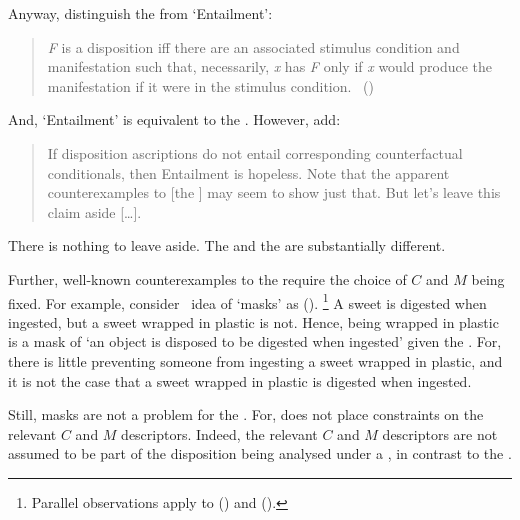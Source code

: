 \begin{note}
{    Anyway, \citeauthor{Choi:2021wg} distinguish the \dSCAa{} from `Entailment':
    \begin{quote}
      \emph{F} is a disposition iff there are an associated stimulus condition and manifestation such that, necessarily, \emph{x} has \emph{F} only if \emph{x} would produce the manifestation if it were in the stimulus condition.%
      \mbox{ }\hfill\mbox{(\citeyear[\S2.1]{Choi:2021wg})}
    \end{quote}
    And, `Entailment' is equivalent to the .
    However, \citeauthor{Choi:2021wg} add:
    \begin{quote}
      If disposition ascriptions do not entail corresponding counterfactual conditionals, then Entailment is hopeless.
      Note that the apparent counterexamples to [the \dSCAa{}] may seem to show just that.
      But let's leave this claim aside [\dots].
    \end{quote}
    There is nothing to leave aside.
    The \dSCAa{} and the \dBCAa{} are substantially different.
  }

  Further, well-known counterexamples to the \dSCAa{} require the choice of \(C\) and \(M\) being fixed.
  For example, consider~\citeauthor{Clarke:2010aa} idea of `masks' as  (\citeyear[153]{Clarke:2010aa}).%
  \footnote{
    Parallel observations apply to (\cite{Johnston:1992aa}) and (\cite{Martin:1994aa}).
  }
  A sweet is digested when ingested, but a sweet wrapped in plastic is not.
  Hence, being wrapped in plastic is a mask of `an object is disposed to be digested when ingested' given the \dSCAa{}.
  For, there is little preventing someone from ingesting a sweet wrapped in plastic, and it is not the case that a sweet wrapped in plastic is digested when ingested.

  Still, masks are not a problem for the \dBCAa{}.
  For, \dBCAa{} does not place constraints on the relevant \(C\) and \(M\) descriptors.
  Indeed, the relevant \(C\) and \(M\) descriptors are not assumed to be part of the disposition being analysed under a \dBCAa{}, in contrast to the \dSCAa{}.


\end{note}
